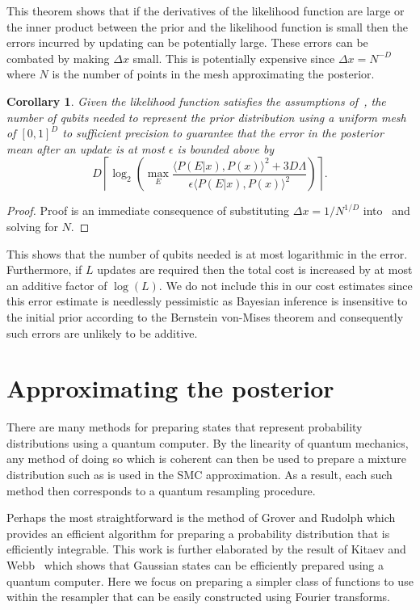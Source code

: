 \documentclass[aps,amsmath,onecolumn,amssymb]{revtex4}
\newtheorem{corollary}{Corollary}
\begin{document}
This theorem shows that if the derivatives of the likelihood function are large or the inner product between the prior and the likelihood function is small then the errors incurred by updating can be potentially large.  These errors can be combated by making $\Delta x$ small.  This is potentially expensive since $\Delta x = N^{-D}$ where $N$ is the number of points in the mesh approximating the posterior.

\begin{corollary}
Given the likelihood function satisfies the assumptions of~, the number of qubits needed to represent the prior distribution using a uniform mesh of $[0,1]^D$ to sufficient precision to guarantee that the error in the posterior mean after an update is at most $\epsilon$ is bounded above by
$$
D \left\lceil\log_2\left(\max_E \frac{\langle P(E|x),P(x)\rangle^2+3{D} \Lambda}{\epsilon \langle P(E|x),P(x)\rangle^2}
\right) \right\rceil.
$$
\end{corollary}
\begin{proof}
Proof is an immediate consequence of substituting $\Delta x =1/N^{1/D}$ into~ and solving for $N$.
\end{proof}
This shows that the number of qubits needed is at most logarithmic in the error.  Furthermore, if $L$ updates are required then the total cost is increased by at most an additive factor of $\log(L)$.  We do not include this in our cost estimates since this error estimate is needlessly pessimistic as Bayesian inference is insensitive to the initial prior according to the Bernstein von-Mises theorem and consequently such errors are unlikely to be additive.


\section{Approximating the posterior}

There are many methods for preparing states that represent probability
distributions using a quantum computer. By the linearity of quantum mechanics,
any method of doing so which is coherent can then be used to prepare a mixture
distribution such as is used in the SMC approximation. As a result, each such
method then corresponds to a quantum resampling procedure.

Perhaps the most straightforward is the method of Grover and Rudolph which
provides an efficient algorithm for preparing a probability distribution that
is efficiently integrable.  This work is further elaborated by the result of
Kitaev and Webb~\cite{KW08} which shows that Gaussian states can be efficiently prepared
using a quantum computer.  Here we focus on preparing a simpler class of
functions to use within the resampler that can be easily constructed using
Fourier transforms.
\end{document}
